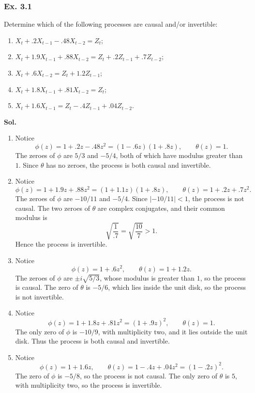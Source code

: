 \documentclass[lang=en,11pt,a4paper,citestyle =authoryear]{elegantpaper}
\begin{document}
\subsubsection*{Ex. 3.1}
Determine which of the following processes are causal and/or invertible:
\begin{enumerate}[label=(\alph*),leftmargin=*]
    \item $X_t+.2X_{t-1}-.48X_{t-2}=Z_t$;
    \item $X_t+1.9X_{t-1}+.88X_{t-2}
    =Z_t+.2Z_{t-1}+.7Z_{t-2}$;
    \item $X_t+.6X_{t-2}=Z_t+1.2Z_{t-1}$;
    \item $X_t+1.8X_{t-1}+.81X_{t-2}=Z_t$;
    \item $X_t+1.6X_{t-1}=Z_t-.4Z_{t-1}+.04Z_{t-2}$.
\end{enumerate}
\par\vspace{0.5em}
\textbf{Sol.}\par
\begin{enumerate}[label=(\alph*),leftmargin=*]
    \item Notice
    \[
    \phi(z)=1+.2z-.48z^2=(1-.6z)(1+.8z),
    \qquad \theta(z)=1.
    \]
    The zeroes of $\phi$ are $5/3$ and $-5/4$, both of which have
    modulus greater than $1$. Since $\theta$ has no zeroes, the process is
    both causal and invertible.

    \item Notice
    \[
    \phi(z)=1+1.9z+.88z^2=(1+1.1z)(1+.8z),
    \qquad \theta(z)=1+.2z+.7z^2.
    \]
    The zeroes of $\phi$ are $-10/11$ and $-5/4$. Since
    $|-10/11|<1$, the process is not causal. The two zeroes of $\theta$
    are complex conjugates, and their common modulus is
    \[
    \sqrt{\frac{1}{.7}}=\sqrt{\frac{10}{7}}>1.
    \]
    Hence the process is invertible.

    \item Notice
    \[
    \phi(z)=1+.6z^2,
    \qquad \theta(z)=1+1.2z.
    \]
    The zeroes of $\phi$ are $\pm i\sqrt{5/3}$, whose modulus is greater
    than $1$, so the process is causal. The zero of $\theta$ is $-5/6$,
    which lies inside the unit disk, so the process is not invertible.

    \item Notice
    \[
    \phi(z)=1+1.8z+.81z^2=(1+.9z)^2,
    \qquad \theta(z)=1.
    \]
    The only zero of $\phi$ is $-10/9$, with multiplicity two, and it lies
    outside the unit disk. Thus the process is both causal and invertible.

    \item Notice
    \[
    \phi(z)=1+1.6z,
    \qquad
    \theta(z)=1-.4z+.04z^2=(1-.2z)^2.
    \]
    The zero of $\phi$ is $-5/8$, so the process is not causal. The only
    zero of $\theta$ is $5$, with multiplicity two, so the process is
    invertible.
\end{enumerate}
\vspace{1em}
\end{document}
